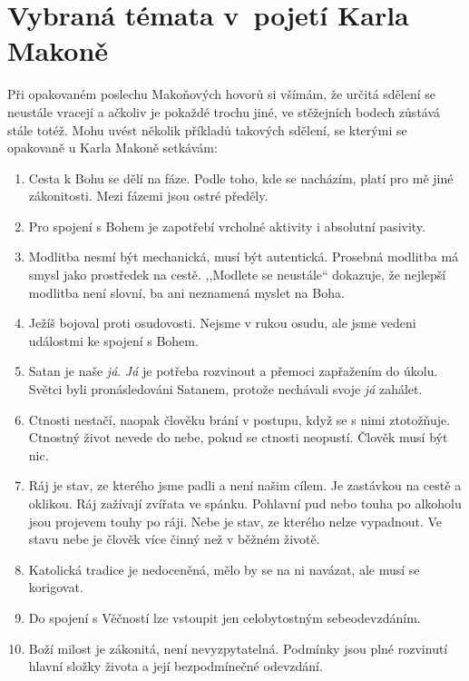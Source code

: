 \chapter{Vybraná témata v~pojetí Karla Makoně}

Při opakovaném poslechu Makoňových hovorů si všímám, že určitá sdělení se
neustále vracejí a ačkoliv je pokaždé trochu jiné, ve stěžejních bodech zůstává
stále totéž. Mohu uvést několik příkladů takových sdělení, se kterými se
opakovaně u Karla Makoně setkávám:

\begin{enumerate}
  \item{
      Cesta k Bohu se dělí na fáze. Podle toho, kde se nacházím, platí pro mě
      jiné zákonitosti.  Mezi fázemi jsou ostré předěly.
  }
  \item{
      Pro spojení s Bohem je zapotřebí vrcholné aktivity i absolutní pasivity.
  }
  \item{
      Modlitba nesmí být mechanická, musí být autentická.
      Prosebná modlitba má smysl jako prostředek na cestě.
      ,,Modlete se neustále`` dokazuje, že nejlepší modlitba není slovní, ba ani neznamená myslet na Boha.
  }
  \item{
    Ježíš bojoval proti osudovosti.
    Nejsme v rukou osudu, ale jsme vedeni událostmi ke spojení s Bohem.
  }
  \item{
    Satan je naše \textit{já}.
    \textit{Já} je potřeba rozvinout a přemoci zapřažením do úkolu.
    Světci byli pronásledováni Satanem, protože nechávali svoje \textit{já} zahálet.
  }
  \item{
    Ctnosti nestačí, naopak člověku brání v postupu, když se s nimi ztotožňuje.
    Ctnostný život nevede do nebe, pokud se ctnosti neopustí.
    Člověk musí být nic.
  }
  \item{
    Ráj je stav, ze kterého jsme padli a není našim cílem.
    Je zastávkou na cestě a oklikou.
    Ráj zažívají zvířata ve spánku.
    Pohlavní pud nebo touha po alkoholu jsou projevem touhy po ráji.
    Nebe je stav, ze kterého nelze vypadnout.
    Ve stavu nebe je člověk více činný než v běžném životě.
  }
  \item{
    Katolická tradice je nedoceněná, mělo by se na ni navázat, ale musí se korigovat.
  }
  \item{
    Do spojení s Věčností lze vstoupit jen celobytostným sebeodevzdáním.
  }
  \item{
    Boží milost je zákonitá, není nevyzpytatelná.
    Podmínky jsou plné rozvinutí hlavní složky života a její bezpodmínečné odevzdání.
}
\end{enumerate}
